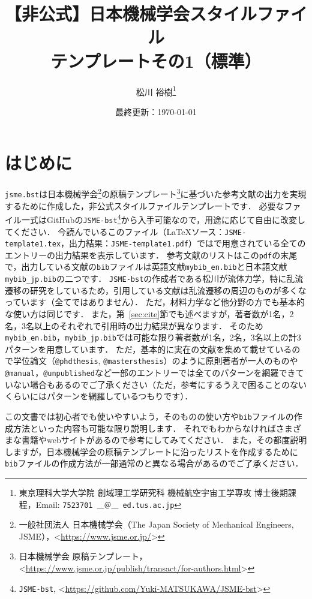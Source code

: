 \documentclass[a4paper,fleqn,uplatex,dvipdfmx]{jsarticle}
\title{【非公式】日本機械学会\BibTeX{}スタイルファイル \\ \JSMErepos テンプレートその1（標準）}
\author{松川 裕樹\thanks{東京理科大学大学院 創域理工学研究科 機械航空宇宙工学専攻 博士後期課程，Email: \texttt{7523701 ＿＠＿ ed.tus.ac.jp}}}
\date{最終更新：\today}
\newcommand{\jsmefile}{\texttt{jsme.bst}}
\newcommand{\JSMErepos}{\texttt{JSME-bst}}
\begin{document}
\maketitle
\thispagestyle{cover}

\vspace{-5mm}
\tableofcontents

\section{はじめに}
\label{sec:introduction}
\jsmefile は日本機械学会\footnote{一般社団法人 日本機械学会（The Japan Society of Mechanical Engineers, JSME），\textless\url{https://www.jsme.or.jp/}\textgreater}の原稿テンプレート\footnote{日本機械学会 原稿テンプレート，\textless\url{https://www.jsme.or.jp/publish/transact/for-authors.html}\textgreater}に基づいた参考文献の出力を実現するために作成した，非公式\BibTeX{}スタイルファイルテンプレートです．
必要なファイル一式はGitHubの\JSMErepos\footnote{\JSMErepos, \textless\url{https://github.com/Yuki-MATSUKAWA/JSME-bst}\textgreater}から入手可能なので，用途に応じて自由に改変してください．
今読んでいるこのファイル（\LaTeX{}ソース：\verb|JSME-template1.tex|，出力結果：\verb|JSME-template1.pdf|）では\BibTeX{}で用意されている全てのエントリーの出力結果を表示しています．
参考文献のリストはこの\verb|pdf|の末尾で，出力している文献の\verb|bib|ファイルは英語文献\verb|mybib_en.bib|と日本語文献\verb|mybib_jp.bib|の二つです．
\JSMErepos の作成者である松川が流体力学，特に乱流遷移の研究をしているため，引用している文献は乱流遷移の周辺のものが多くなっています（全てではありません）．
ただ，材料力学など他分野の方でも基本的な使い方は同じです．
また，第~\ref{sec:cite}節でも述べますが，著者数が1名，2名，3名以上のそれぞれで引用時の出力結果が異なります．
そのため\verb|mybib_en.bib|，\verb|mybib_jp.bib|では可能な限り著者数が1名，2名，3名以上の計3パターンを用意しています．
ただ，基本的に実在の文献を集めて載せているので学位論文（\verb|@phdthesis|, \verb|@mastersthesis|）のように原則著者が一人のものや\verb|@manual|，\verb|@unpublished|など一部のエントリーでは全てのパターンを網羅できていない場合もあるのでご了承ください（ただ，参考にするうえで困ることのないくらいにはパターンを網羅しているつもりです）．

この文書では\BibTeX{}初心者でも使いやすいよう，\BibTeX{}そのものの使い方や\verb|bib|ファイルの作成方法といった内容も可能な限り説明します．
それでもわからなければさまざまな書籍やwebサイトがあるので参考にしてみてください．
また，その都度説明しますが，日本機械学会の原稿テンプレートに沿ったリストを作成するために\verb|bib|ファイルの作成方法が一部通常の\BibTeX{}と異なる場合があるのでご了承ください．
\end{document}
